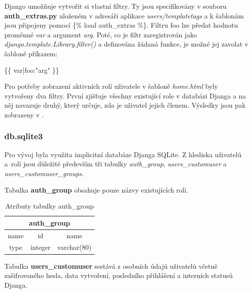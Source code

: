Django umožňuje vytvořit si vlastní filtry. Ty jsou specifikovány v
souboru \textbf{auth\_extras.py} uloženém v adresáři aplikace
\textit{users/templatetags} a k šablonám jsou připojeny pomocí
\textsf{\{\% load auth\_extras \%\}}. Filtru \textsf{foo} lze předat
hodnotu proměnné \textit{var} a argument \textit{arg}. Poté, co je
filtr zaregistrován jako \textit{django.template.Library.filter()} a
definována žádaná funkce, je možné jej zavolat v šabloně příkazem:

\textsf{\{\{ var|foo:"arg" \}\}}

Pro potřeby zobrazení aktivních rolí uživatele v šabloně
\textit{home.html} byly vytvořeny dva filtry. První zjišťuje všechny
existující role v databázi Djanga a na něj navazuje druhý, který
určuje, zda je uživatel jejich členem. Výsledky jsou pak zobrazeny v
.

\subsubsection{db.sqlite3}

Pro vývoj byla využita implicitní databáze Djanga SQLite. Z hlediska
uživatelů a~rolí jsou důležité především tři tabulky
\textit{auth\_group}, \textit{users\_customuser} a\newline
\textit{users\_customuser\_groups}.

Tabulka \textbf{auth\_group} obsahuje pouze názvy existujících rolí.

\begin{table}[H]
\centering
\begin{tabular}{@{}|c|c|c|@{}}
\toprule
\multicolumn{3}{|c|}{auth\_group} \\ \midrule
name & id & name \\ \midrule
type & integer & varchar(80) \\ \bottomrule
\end{tabular}
\caption{Atributy tabulky auth\_group}
\label{tab:auth-group}
\end{table}

Tabulka \textbf{users\_customuser} sestává z osobních údajů uživatelů
včetně zašifrovaného hesla, data vytvoření, posledního přihlášení a
interních statusů Djanga.

\begin{table}[H]
\centering
{}
\caption{Atributy tabulky users\_customuser 1/2}
\label{tab:users-customuser-1}
\end{table}

